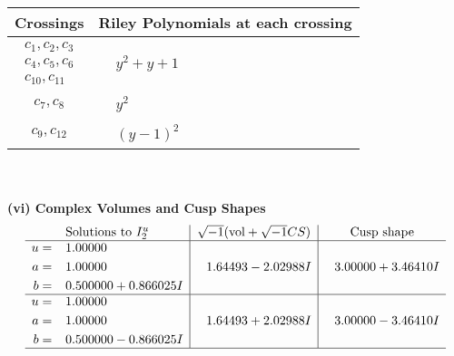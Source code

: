 \documentclass[1p]{elsarticle_modified}
\theoremstyle{definition}
\newcommand{\I}{\sqrt{-1}}
\begin{document}
\begin{tabular}{m{50pt}|m{274pt}}
Crossings & \hspace{64pt}Riley Polynomials at each crossing \\
\hline $$\begin{aligned}c_{1},c_{2},c_{3}\\c_{4},c_{5},c_{6}\\c_{10},c_{11}\end{aligned}$$&$\begin{aligned}
&y^2+y+1
\end{aligned}$\\
\hline $$\begin{aligned}c_{7},c_{8}\end{aligned}$$&$\begin{aligned}
&y^2
\end{aligned}$\\
\hline $$\begin{aligned}c_{9},c_{12}\end{aligned}$$&$\begin{aligned}
&(y-1)^2
\end{aligned}$\\
\hline
\end{tabular}\\~\\
\newpage\flushleft \textbf{(vi) Complex Volumes and Cusp Shapes}
$$\begin{array}{c|c|c}  
\text{Solutions to }I^u_{2}& \I (\text{vol} + \sqrt{-1}CS) & \text{Cusp shape}\\
 \hline 
\begin{aligned}
u &= \phantom{-}1.00000\phantom{ +0.000000I} \\
a &= \phantom{-}1.00000\phantom{ +0.000000I} \\
b &= \phantom{-}0.500000 + 0.866025 I\end{aligned}
 & \phantom{-}1.64493 - 2.02988 I & \phantom{-}3.00000 + 3.46410 I \\ \hline\begin{aligned}
u &= \phantom{-}1.00000\phantom{ +0.000000I} \\
a &= \phantom{-}1.00000\phantom{ +0.000000I} \\
b &= \phantom{-}0.500000 - 0.866025 I\end{aligned}
 & \phantom{-}1.64493 + 2.02988 I & \phantom{-}3.00000 - 3.46410 I\\
 \hline 
 \end{array}$$\newpage
\newpage\renewcommand{\arraystretch}{1}
\end{document}
